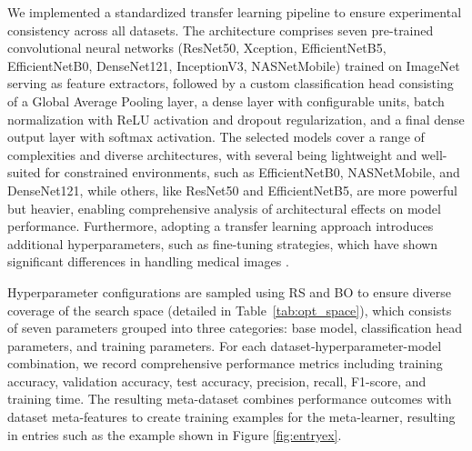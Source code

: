 \documentclass{article}
\begin{document}
We implemented a standardized transfer learning pipeline to ensure experimental consistency across all datasets. The architecture comprises seven pre-trained convolutional neural networks (ResNet50\cite{resnet}, Xception\cite{xception}, EfficientNetB5\cite{efficientnet}, EfficientNetB0\cite{efficientnet}, DenseNet121\cite{densenet}, InceptionV3\cite{inception}, NASNetMobile\cite{nasnet}) trained on ImageNet serving as feature extractors, followed by a custom classification head consisting of a Global Average Pooling layer, a dense layer with configurable units, batch normalization with ReLU activation and dropout regularization, and a final dense output layer with softmax activation. The selected models cover a range of complexities and diverse architectures, with several being lightweight and well-suited for constrained environments, such as EfficientNetB0, NASNetMobile, and DenseNet121, while others, like ResNet50 and EfficientNetB5, are more powerful but heavier, enabling comprehensive analysis of architectural effects on model performance. Furthermore, adopting a transfer learning approach introduces additional hyperparameters, such as fine-tuning strategies, which have shown significant differences in handling medical images \cite{bal2023transfer}.

Hyperparameter configurations are sampled using RS and BO to ensure diverse coverage of the search space (detailed in Table~\ref{tab:opt_space}), which consists of seven parameters grouped into three categories: base model, classification head parameters, and training parameters. For each dataset-hyperparameter-model combination, we record comprehensive performance metrics including training accuracy, validation accuracy, test accuracy, precision, recall, F1-score, and training time. The resulting meta-dataset combines performance outcomes with dataset meta-features to create training examples for the meta-learner, resulting in entries such as the example shown in Figure \ref{fig:entryex}.
\end{document}
